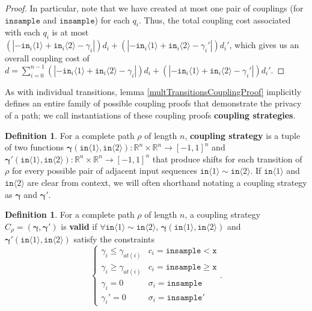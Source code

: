 \documentclass[12pt]{article}
\newcommand{\RR}{\mathbb{R}}
\newcommand{\gguard}[1][x]{\texttt{insample}\geq#1}
\newcommand{\lguard}[1][x]{\texttt{insample} < #1}
\newcommand{\brangle}[1]{\langle#1 \rangle}
\theoremstyle{definition}
\newtheorem{defn}[thm]{Definition}
\begin{document}
\begin{proof}
    In particular, note that we have created at most one pair of couplings (for $\texttt{insample}$ and $\texttt{insample}$) for each $q_i$. Thus, the total coupling cost associated with each $q_i$ is at most $(|-\texttt{in}_i\brangle{1}+\texttt{in}_i\brangle{2}-\gamma_i|)d_i+(|-\texttt{in}_i\brangle{1}+\texttt{in}_i\brangle{2}-\gamma_i'|)d_i'$, 
    which gives us an overall coupling cost of $d = \sum_{i=0}^{n-1}(|-\texttt{in}_i\brangle{1}+\texttt{in}_i\brangle{2}-\gamma_i|)d_i+(|-\texttt{in}_i\brangle{1}+\texttt{in}_i\brangle{2}-\gamma_i'|)d_i'$.
\end{proof}

As with individual transitions, lemma \ref{multTransitionsCouplingProof} implicitly defines an entire family of possible coupling proofs that demonstrate the privacy of a path; we call instantiations of these coupling proofs \textbf{coupling strategies}. 

\begin{defn}
    For a complete path $\rho$ of length $n$, \textbf{coupling strategy} is a tuple of two functions $\bm{\gamma}(\texttt{in}\brangle{1}, \texttt{in}\brangle{2}):\RR^n\times \RR^n\to [-1, 1]^n$ and $\bm{\gamma}'(\texttt{in}\brangle{1}, \texttt{in}\brangle{2}):\RR^n\times \RR^n\to [-1, 1]^n$ that produce shifts for each transition of $\rho$ for every possible pair of adjacent input sequences $\texttt{in}\brangle{1}\sim\texttt{in}\brangle{2}$. 
    If $\texttt{in}\brangle{1}$ and $\texttt{in}\brangle{2}$ are clear from context, we will often shorthand notating a coupling strategy as $\bm{\gamma}$ and $\bm{\gamma}'$. 
\end{defn}


\begin{defn}
    For a complete path $\rho$ of length $n$, a coupling strategy $C_\rho = (\bm{\gamma}, \bm{\gamma}')$ is \textbf{valid} if $\forall \texttt{in}\brangle{1}\sim\texttt{in}\brangle{2}$, $\bm{\gamma}(\texttt{in}\brangle{1}, \texttt{in}\brangle{2})$ and $\bm{\gamma}'(\texttt{in}\brangle{1}, \texttt{in}\brangle{2})$ satisfy the constraints \[
        \begin{cases}
          \gamma_i\leq\gamma_{at(i)} & c_i = \lguard[\texttt{x}]\\
          \gamma_i\geq\gamma_{at(i)} & c_i = \gguard[\texttt{x}]\\
          \gamma_i=0 & \sigma_i = \texttt{insample}\\
          \gamma_i'=0 & \sigma_i = \texttt{insample}'
        \end{cases}.
      \]
\end{defn}
\end{document}
